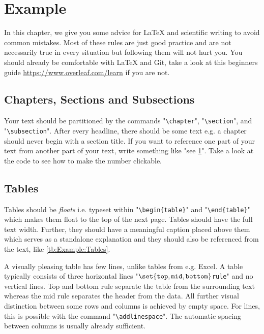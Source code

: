 
\chapter{Example}
\label{ch:Example}%
In this chapter, we give you some advice for \LaTeX{} and scientific writing to avoid common mistakes.
Most of these rules are just good practice and are not necessarily true in every situation but following them will not hurt you.
You should already be comfortable with \LaTeX{} and Git, take a look at this beginners guide \url{https://www.overleaf.com/learn} if you are not.


\section{Chapters, Sections and Subsections}
\label{sec:Example:Chapters}
Your text should be partitioned by the commands "\texttt{\textbackslash{}chapter}", "\texttt{\textbackslash{}section}", and "\texttt{\textbackslash{}subsection}".
After every headline, there should be some text e.g. a chapter should never begin with a section title.
If you want to reference one part of your text from another part of your text, write something like "see \cref{ch:Example}".
Take a look at the code to see how to make the number clickable.


\section{Tables}
\label{sec:Example:Tables}
Tables should be \emph{floats} i.e. typeset within "\texttt{\textbackslash{}begin\{table\}}" and "\texttt{\textbackslash{}end\{table\}}" which makes them float to the top of the next page.
Tables should have the full text width.
Further, they should have a meaningful caption placed above them which serves as a standalone explanation and they should also be referenced from the text, like \cref{tb:Example:Tables}.

A visually pleasing table has few lines, unlike tables from e.g. Excel.
A table typically consists of three horizontal lines "$\set{\texttt{top},\texttt{mid},\texttt{bottom}}$\texttt{rule}" and no vertical lines.
Top and bottom rule separate the table from the surrounding text whereas the mid rule separates the header from the data.
All further visual distinction between some rows and columns is achieved by empty space.
For lines, this is possible with the command "\texttt{\textbackslash{}addlinespace}".
The automatic spacing between columns is usually already sufficient.


